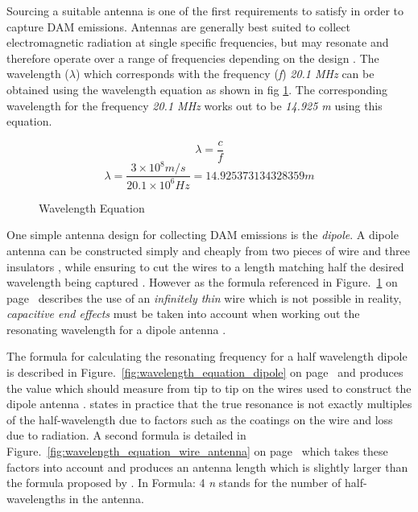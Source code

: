Sourcing a suitable antenna is one of the first requirements to satisfy in order to capture \gls{DAM} emissions. Antennas are generally best suited to collect electromagnetic radiation at single specific frequencies, but may resonate and therefore operate over a range of frequencies depending on the design \citep{nasa12}. The wavelength ($\lambda$) which corresponds with the frequency (\textit{f}) \textit{20.1 MHz} can be obtained using the wavelength equation as shown in fig \ref{fig:wavelength_equation}. The corresponding wavelength for the frequency \textit{20.1 MHz} works out to be \textit{14.925 m} using this equation.

%
\begin{figure}[here]
  \centering
  \begin{equation}  	
    \lambda = \frac{c}{f}
  \end{equation}
  \begin{equation}
    \lambda = \frac{3\times10^8 m/s}{20.1\times10^6 Hz} = 14.925373134328359 m
  \end{equation}
  \caption{Wavelength Equation}
  \label{fig:wavelength_equation}
\end{figure}
%

One simple antenna design for collecting \gls{DAM} emissions is the \textit{dipole}. A dipole antenna can be constructed simply and cheaply from two pieces of wire and three insulators \citep{nasa12}, while ensuring to cut the wires to a length matching half the desired wavelength being captured \citep{nasa12}. However as the formula referenced in Figure.~\ref{fig:wavelength_equation} on page~\pageref{fig:wavelength_equation} describes the use of an \textit{infinitely thin} wire which is not possible in reality, \textit{capacitive end effects} must be taken into account when working out the resonating wavelength for a dipole antenna \citep{nasa12}.

The formula for calculating the resonating frequency for a half wavelength dipole is described in Figure.~\ref{fig:wavelength_equation_dipole} on page~\pageref{fig:wavelength_equation_dipole} and produces the value which should measure from tip to tip on the wires used to construct the dipole antenna \citep{nasa12}. \cite{RSGB-14} states in practice that the true resonance is not exactly multiples of the half-wavelength due to factors such as the coatings on the wire and loss due to radiation. A second formula is detailed in Figure.~\ref{fig:wavelength_equation_wire_antenna} on page~\pageref{fig:wavelength_equation_wire_antenna} which takes these factors into account and produces an antenna length which is slightly larger than the formula proposed by \citep{nasa12}. In Formula: 4 \textit{n} stands for the number of half-wavelengths in the antenna.

